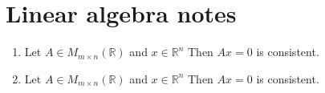 \documentclass[12pt]{article}
\newcommand{\R}{\mathbb{R}}
\begin{document}
	\section*{Linear algebra notes}
	\begin{enumerate}
	\item Let $A \in M_{m \times n}(\R)$ and $x \in \R^{n}$ Then $Ax = 0$ is consistent.
	\item Let $A \in M_{m \times n}(\R)$ and $x \in \R^{n}$ Then $Ax = 0$ is consistent.  
	\end{enumerate}
	
\end{document}
